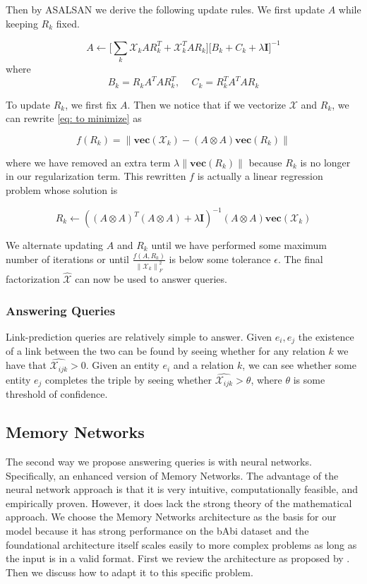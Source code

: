 \documentclass[pageno]{jpaper}
\newcommand{\norm}[1]{\left\lVert#1\right\rVert}
\begin{document}
Then by ASALSAN we derive the following update rules. We first update $A$ while
keeping $R_k$ fixed.

$$A \leftarrow \bigg[ \sum_k \mathcal{X}_kAR_k^T + \mathcal{X}_k^TAR_k \bigg] \bigg[ B_k + C_k + \lambda\mathbf{I} \bigg]^{-1}$$
where
$$B_k = R_k A^T AR_k^T,\,\,\,\,\,\,\, C_k = R_k^TA^TAR_k$$

To update $R_k$, we first fix $A$. Then we notice that if we vectorize $\mathcal{X}$ and
$R_k$, we can rewrite \ref{eq: to minimize} as

$$f(R_k) = \norm{\textbf{vec}\left(\mathcal{X}_k\right) - \left(A \otimes A \right)
\textbf{vec}\left(R_k\right)}$$

where we have removed an extra term $\lambda \norm{\textbf{vec}(R_k)}$ because
$R_k$ is no longer in our regularization term. This rewritten $f$ is actually
a linear regression problem whose solution is

$$R_k \leftarrow \left( \left(A \otimes A \right)^T \left(A \otimes A\right) + \lambda\textbf{I}
 \right) ^{-1} \left(A \otimes A\right) \textbf{vec}\left(\mathcal{X}_k\right)$$

We alternate updating $A$ and $R_k$ until we have performed some maximum number
of iterations or until $\frac{f(A, R_k)}{\norm{\mathcal{X}_k}_F^2}$ is below
some tolerance $\epsilon$. The final factorization $\hat{\mathcal{X}}$ can now be used to answer
queries.

\subsubsection{Answering Queries}
\label{Answering Queries}

Link-prediction queries are relatively simple to answer. Given $e_i, e_j$
the existence of a link between the two can be found by seeing whether for any
relation $k$ we have that $\hat{\mathcal{X}_{ijk}} > 0$. Given an entity $e_i$ and a relation
$k$, we can see whether some entity $e_j$ completes the triple by seeing whether
$\hat{\mathcal{X}_{ijk}} > \theta$, where $\theta$ is some threshold of confidence.

\subsection{Memory Networks}
\label{Memory Networks}

The second way we propose answering queries is with neural networks.
Specifically, an enhanced version of Memory Networks. The advantage of the
neural network approach is that it is very intuitive, computationally feasible,
and empirically proven. However, it does lack the strong theory of the
mathematical approach. We choose the Memory Networks architecture as the basis
for our model because it has strong performance on the bAbi dataset and the
foundational architecture itself scales easily to more complex problems as long
as the input is in a valid format. First we review the architecture as proposed
by \cite{Sukhbaatar2015}. Then we discuss how to adapt it to this specific
problem. \\
\end{document}
